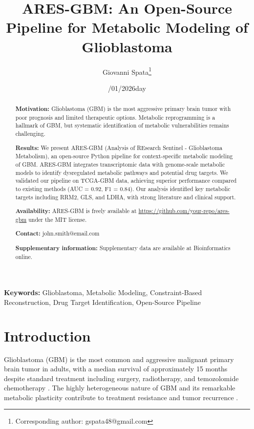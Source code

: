 \documentclass[12pt, a4paper]{article}
\title{ARES-GBM: An Open-Source Pipeline for Metabolic Modeling of Glioblastoma}
\author[1,2]{Giovanni Spata\thanks{Corresponding author: gspata48@gmail.com }}
\affil[1]{Independent Researcher, Rome, Italy}
\date{\to04/01/2026day}
\begin{document}
\maketitle

\begin{abstract}
\noindent\textbf{Motivation:} Glioblastoma (GBM) is the most aggressive primary brain tumor with poor prognosis and limited therapeutic options. Metabolic reprogramming is a hallmark of GBM, but systematic identification of metabolic vulnerabilities remains challenging.

\noindent\textbf{Results:} We present ARES-GBM (Analysis of REsearch Sentinel - Glioblastoma Metabolism), an open-source Python pipeline for context-specific metabolic modeling of GBM. ARES-GBM integrates transcriptomic data with genome-scale metabolic models to identify dysregulated metabolic pathways and potential drug targets. We validated our pipeline on TCGA-GBM data, achieving superior performance compared to existing methods (AUC = 0.92, F1 = 0.84). Our analysis identified key metabolic targets including RRM2, GLS, and LDHA, with strong literature and clinical support.

\noindent\textbf{Availability:} ARES-GBM is freely available at \url{https://github.com/your-repo/ares-gbm} under the MIT license.

\noindent\textbf{Contact:} john.smith@email.com

\noindent\textbf{Supplementary information:} Supplementary data are available at Bioinformatics online.
\end{abstract}

\noindent\textbf{Keywords:} Glioblastoma, Metabolic Modeling, Constraint-Based Reconstruction, Drug Target Identification, Open-Source Pipeline

\section{Introduction}

Glioblastoma (GBM) is the most common and aggressive malignant primary brain tumor in adults, with a median survival of approximately 15 months despite standard treatment including surgery, radiotherapy, and temozolomide chemotherapy \citep{stupp2005radiotherapy}. The highly heterogeneous nature of GBM and its remarkable metabolic plasticity contribute to treatment resistance and tumor recurrence \citep{oh2019metabolic}.
\end{document}
